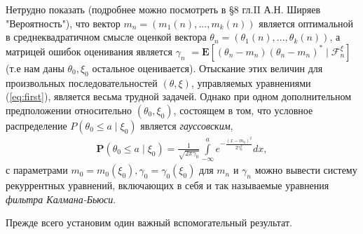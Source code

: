 Нетрудно показать (подробнее можно посмотреть в \S 8 гл.II А.Н. Ширяев "Вероятность"), что вектор $m_n = (m_1(n), ..., m_k(n))$ является оптимальной в среднеквадратичном смысле оценкой вектора $\theta_n = (\theta_1(n), ..., \theta_k(n))$, а матрицей ошибок оценивания является $\gamma_n$ $= \mathbf{E} \left[(\theta_n - m_n)(\theta_n - m_n)^*\mid \mathscr{F}^{\xi}_n \right]$(т.е нам даны $\theta_0, \xi_0$ остальное оценивается). Отыскание этих величин для произвольных последовательностей $(\theta, \xi)$, управляемых уравнениями (\ref{eq:first}), является весьма трудной задачей. Однако при одном дополнительном предположении относительно $(\theta_0, \xi_0)$, состоящем в том, что условное распределение $P (\theta_0 \leqslant a\mid\xi_0)$ является \textit{гауссовским},
\begin{align}
\label{eq:second}
\mathbf{P} (\theta_0 \leqslant a\mid\xi_0) = \frac{1}{\sqrt{2 \pi \gamma_0}} \int \limits_{-\infty}^{a} e^{-\frac{(x - m_0)^2}{2 \gamma_0^2}} dx,
\end{align}
с параметрами $m_0 = m_0(\xi_0), \gamma_0 = \gamma_0(\xi_0)$ для $m_n$ и $\gamma_n$ можно вывести систему рекуррентных уравнений, включающих в себя и так называемые уравнения \textit{фильтра Калмана-Бьюси}.

Прежде всего установим один важный вспомогательный результат.

